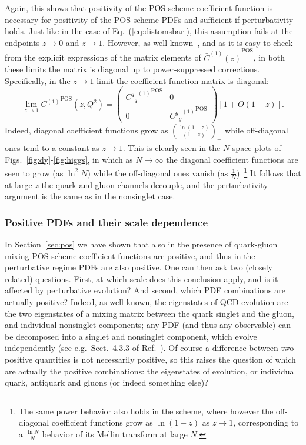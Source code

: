 Again, this shows that positivity of the POS-scheme  coefficient function is
necessary for positivity of the POS-scheme PDFs and sufficient if
perturbativity holds. Just like in the case of
Eq.~(\ref{eq:distomsbar}), this assumption fails at the endpoints
$z\to0$ and $z\to 1$. However, as well known~\cite{Ellis:1991qj}, and
as it is easy to check from the explicit expressions of the matrix
elements of ${\bar
    C^{(1)}(z)}^{\textrm{POS}}$, in both these limits the matrix
  is diagonal up to power-suppressed corrections. Specifically, 
 in the $z\to1$ limit the coefficient function matrix is diagonal:
\begin{equation}\label{eq:diag}
    \lim_{z\to 1}  {C^{(1)}}^{\textrm{POS}}(z,Q^2)=\left(\begin{array}{cc} {{{C^{q}}_q}^{(1)}}^{\textrm{POS}} &
      0 \\0 & {{{C^{g}}_g}^{(1)}}^{\textrm{POS}} \end{array}\right)\left[1+O(1-z)\right].
\end{equation}
Indeed, diagonal coefficient functions grow as
$\left(\frac{\ln(1-z)}{(1-z)}\right)_+$ while off-diagonal ones tend to a constant
as $z\to1$. This is clearly seen in the $N$ space plots of
Figs.~\ref{fig:dy}-\ref{fig:higgs}, in which as $N\to\infty$ the diagonal coefficient
functions are seen to grow (as $\ln^2N$) while the off-diagonal ones
vanish (as $\frac{1}{N}$)~\footnote{The same power behavior also
  holds in the \msbar{} scheme, where however the off-diagonal
  coefficient functions grow as $\ln(1-z)$ as $z\to 1$, corresponding
  to a $\frac{\ln N}{N}$ behavior of its Mellin transform at large $N$.}
It follows that at large $z$ the quark and gluon channels decouple, and
the perturbativity argument is the same as in the
nonsinglet case. 

\subsubsection{Positive PDFs and their scale dependence}
\label{sec:ap}


In Section~\ref{sec:pos}
we have shown that also in the presence of quark-gluon
mixing  POS-scheme
coefficient functions are positive, and thus in the perturbative
regime PDFs are also positive. One can then ask two (closely related)
questions. First, at which scale does this conclusion apply, and is it
affected by perturbative evolution? And second, which PDF combinations
are actually positive?
Indeed, as well known, the eigenstates of QCD evolution are the two
eigenstates of a mixing matrix between the quark singlet and the
gluon,  and individual nonsinglet components; any PDF (and thus any
observable) can be decomposed into a singlet and nonsinglet component,
which evolve independently (see
e.g.\ Sect.~4.3.3 of Ref.~\cite{Ellis:1991qj}). Of course a difference
between two positive quantities is not necessarily positive, so this
raises the question of which are actually the positive combinations:
the eigenstates of evolution, or individual quark, antiquark and
gluons (or indeed something else)?

